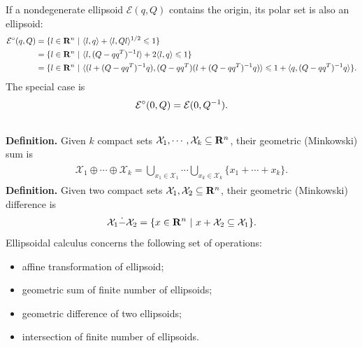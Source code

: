 \documentclass[letterpaper,10pt,english]{sphinxmanual}
\begin{document}
If a nondegenerate ellipsoid ${\mathcal E}(q,Q)$ contains the
origin, its polar set is also an ellipsoid:
\begin{gather}
\begin{split}\begin{aligned}
{\mathcal E}^\circ(q,Q) & = \{l\in{\bf R}^n ~|~ \langle l,q\rangle +
\langle l,Ql\rangle^{1/2}\leqslant1 \}\\
& = \{l\in{\bf R}^n ~|~ \langle l,(Q-qq^T)^{-1}l\rangle +
2\langle l,q\rangle\leqslant1 \}\\
& = \{l\in{\bf R}^n ~|~ \langle(l+(Q-qq^T)^{-1}q),
(Q-qq^T)(l+(Q-qq^T)^{-1}q)\rangle\leqslant1+\langle q,(Q-qq^T)^{-1}q\rangle \}.\end{aligned}\end{split}\notag
\end{gather}
The special case is
\begin{gather}
\begin{split}{\mathcal E}^\circ(0,Q) = {\mathcal E}(0,Q^{-1}).\end{split}\notag\\\begin{split}\end{split}\notag
\end{gather}
\textbf{Definition.} Given $k$ compact sets
${\mathcal X}_1, \cdots, {\mathcal X}_k\subseteq{\bf R}^n$, their
geometric (Minkowski) sum is
\label{chap_ellcalc:equation-minksum}\begin{gather}
\begin{split}{\mathcal X}_1\oplus\cdots\oplus{\mathcal X}_k=\bigcup_{x_1\in{\mathcal X}_1}\cdots\bigcup_{x_k\in{\mathcal X}_k}
\{x_1 + \cdots + x_k\} .\end{split}\label{chap_ellcalc-minksum}
\end{gather}
\textbf{Definition.} Given two compact sets
${\mathcal X}_1, {\mathcal X}_2 \subseteq{\bf R}^n$, their
geometric (Minkowski) difference is
\label{chap_ellcalc:equation-minkdiff}\begin{gather}
\begin{split}{\mathcal X}_1\dot{-}{\mathcal X}_2 = \{x\in{\bf R}^n ~|~ x + {\mathcal X}_2 \subseteq {\mathcal X}_1 \}.\end{split}\label{chap_ellcalc-minkdiff}
\end{gather}
Ellipsoidal calculus concerns the following set of operations:
\begin{itemize}
\item {} 
affine transformation of ellipsoid;

\item {} 
geometric sum of finite number of ellipsoids;

\item {} 
geometric difference of two ellipsoids;

\item {} 
intersection of finite number of ellipsoids.

\end{itemize}
\end{document}

